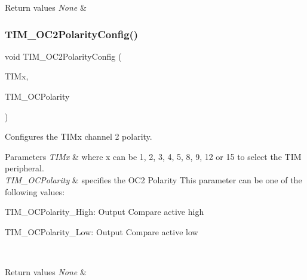 \begin{DoxyRetVals}{Return values}
{\em None} & \\
\hline
\end{DoxyRetVals}
\mbox{\label{group___t_i_m___private___functions_ga6831cacaac1ef50291af94db94450797}} 
\subsubsection{\texorpdfstring{TIM\_OC2PolarityConfig()}{TIM\_OC2PolarityConfig()}}
{\footnotesize\ttfamily void T\+I\+M\+\_\+\+O\+C2\+Polarity\+Config (\begin{DoxyParamCaption}\item[{\mbox{\hyperlink{struct_t_i_m___type_def}{T\+I\+M\+\_\+\+Type\+Def}} $\ast$}]{T\+I\+Mx,  }\item[{uint16\+\_\+t}]{T\+I\+M\+\_\+\+O\+C\+Polarity }\end{DoxyParamCaption})}



Configures the T\+I\+Mx channel 2 polarity. 


\begin{DoxyParams}{Parameters}
{\em T\+I\+Mx} & where x can be 1, 2, 3, 4, 5, 8, 9, 12 or 15 to select the T\+IM peripheral. \\
\hline
{\em T\+I\+M\+\_\+\+O\+C\+Polarity} & specifies the O\+C2 Polarity This parameter can be one of the following values\+: \begin{DoxyItemize}
\item T\+I\+M\+\_\+\+O\+C\+Polarity\+\_\+\+High\+: Output Compare active high \item T\+I\+M\+\_\+\+O\+C\+Polarity\+\_\+\+Low\+: Output Compare active low \end{DoxyItemize}
\\
\hline
\end{DoxyParams}

\begin{DoxyRetVals}{Return values}
{\em None} & \\
\hline
\end{DoxyRetVals}
\mbox{\label{group___t_i_m___private___functions_ga75b4614c6dd2cd52f2c5becdb6590c10}} 
